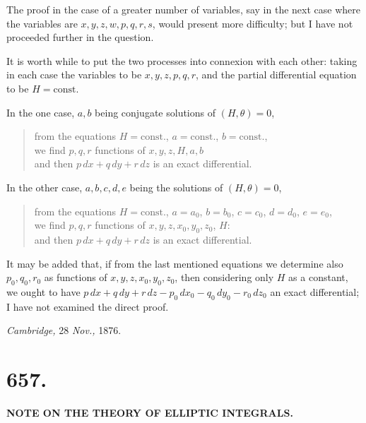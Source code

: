 \documentclass[11pt,a4paper]{article}
\begin{document}
The proof in the case of a greater number of variables, say in the next case where the variables are $x, y, z, w, p, q, r, s$, would present more difficulty; but I have not proceeded further in the question.

It is worth while to put the two processes into connexion with each other: taking in each case the variables to be $x, y, z, p, q, r$, and the partial differential equation to be $H = \text{const.}$

\newpage


In the one case, $a, b$ being conjugate solutions of $(H, \theta) = 0$,
\begin{quote}
from the equations $H = \text{const.}$, $a = \text{const.}$, $b = \text{const.}$,\\
we find $p, q, r$ functions of $x, y, z, H, a, b$\\
and then $p\,dx + q\,dy + r\,dz$ is an exact differential.
\end{quote}
In the other case, $a, b, c, d, e$ being the solutions of $(H, \theta) = 0$,
\begin{quote}
from the equations $H = \text{const.}$, $a = a_{0}$, $b = b_{0}$, $c = c_{0}$, $d = d_{0}$, $e = e_{0}$,\\
we find $p, q, r$ functions of $x, y, z, x_{0}, y_{0}, z_{0}$, $H$:\\
and then $p\,dx + q\,dy + r\,dz$ is an exact differential.
\end{quote}

It may be added that, if from the last mentioned equations we determine also $p_{0}, q_{0}, r_{0}$ as functions of $x, y, z, x_{0}, y_{0}, z_{0}$, then considering only $H$ as a constant, we ought to have $p\,dx + q\,dy + r\,dz - p_{0}\,dx_{0} - q_{0}\,dy_{0} - r_{0}\,dz_{0}$ an exact differential; I have not examined the direct proof.

\medskip

\hfill \emph{Cambridge,} 28 \emph{Nov.,} 1876.

\newpage


\section*{657.}

\begin{center}
\textbf{NOTE ON THE THEORY OF ELLIPTIC INTEGRALS.}
\end{center}
\end{document}
